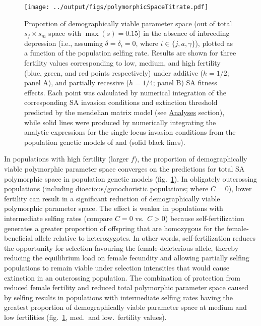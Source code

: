 \documentclass[11pt]{article}
\begin{document}
 \begin{figure}[htbp]
 \centering
 \texttt{[image: ../output/figs/polymorphicSpaceTitrate.pdf]}
 \caption{\footnotesize{Proportion of demographically viable parameter space (out of total $s_f \times s_m$ space with $\max(s) = 0.15$) in the absence of inbreeding depression (i.e., assuming $\delta = \delta_i = 0$, where $i \in \{j,a,\gamma\}$), plotted as a function of the population selfing rate. Results are shown for three fertility values corresponding to low, medium, and high fertility (blue, green, and red points respectively) under additive ($h = 1/2$; panel A), and partially recessive ($h = 1/4$; panel B) SA fitness effects. Each point was calculated by numerical integration of the corresponding SA invasion conditions and extinction threshold predicted by the mendelian matrix model (see \hyperref[subsec:analyses]{Analyses} section), while solid lines were produced by numerically integrating the analytic expressions for the single-locus invasion conditions from the population genetic models of \citet{JordanConnallon2014} and \citet{Olito2017} (solid black lines).}} 
 \label{fig:polySpace}
 \end{figure}


In populations with high fertility (larger $f$), the proportion of demographically viable polymorphic parameter space converges on the predictions for total SA polymorphic space in population genetic models (fig.~\ref{fig:polySpace}). In obligately outcrossing populations (including dioecious/gonochoristic populations; where $C = 0$), lower fertility can result in a significant reduction of demographically viable polymorphic parameter space. The effect is weaker in populations with intermediate selfing rates (compare $C=0$ vs.~$C > 0$) because self-fertilization generates a greater proportion of offspring that are homozygous for the female-beneficial allele relative to heterozygotes. In other words, self-fertilization reduces the opportunity for selection favouring the female-deleterious allele, thereby reducing the equilibrium load on female fecundity and allowing partially selfing populations to remain viable under selection intensities that would cause extinction in an outcrossing population. The combination of protection from reduced female fertility and reduced total polymorphic parameter space caused by selfing results in populations with intermediate selfing rates having the greatest proportion of demographically viable parameter space at medium and low fertilities (fig.~\ref{fig:polySpace}, med.~and low.~fertility values).
\end{document}
